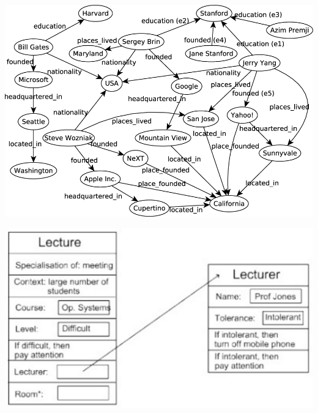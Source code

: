 \documentclass[landscape]{jhuslides3C}
\begin{document}

\vfill
\begin{center}
\includegraphics[width=21cm]{knowledge-graph.png}
\end{center}
\vfill


\vfill
\begin{center}
\includegraphics[width=24cm]{frame-example.png}
\end{center}
\vfill

\end{document}
